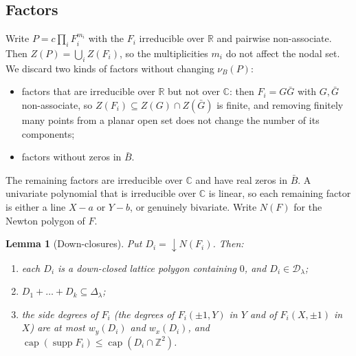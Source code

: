 \documentclass[11pt]{amsart}
\newtheorem{lemma}[theorem]{Lemma}
\theoremstyle{definition}
\theoremstyle{remark}
\newcommand{\R}{\mathbb{R}}
\newcommand{\C}{\mathbb{C}}
\newcommand{\Z}{\mathbb{Z}}
\newcommand{\capn}{\operatorname{cap}}
\newcommand{\supp}{\operatorname{supp}}
\newcommand{\down}{{\downarrow}}
\numberwithin{equation}{section}
\begin{document}
\subsection{Factors}
Write $P=c\prod_iF_i^{m_i}$ with the $F_i$ irreducible over $\R$ and pairwise non-associate.
Then $Z(P)=\bigcup_iZ(F_i)$, so the multiplicities $m_i$ do not affect the nodal set. We
discard two kinds of factors without changing $\nu_B(P)$:
\begin{itemize}[nosep]
\item factors that are irreducible over $\R$ but not over $\C$: then $F_i=G\bar G$ with
$G,\bar G$ non-associate, so $Z(F_i)\subseteq Z(G)\cap Z(\bar G)$ is finite, and removing
finitely many points from a planar open set does not change the number of its components;
\item factors without zeros in $\bar B$.
\end{itemize}
The remaining factors are irreducible over $\C$ and have real zeros in $\bar B$. A
univariate polynomial that is irreducible over $\C$ is linear, so each remaining factor is
either a line $X-a$ or $Y-b$, or genuinely bivariate. Write $N(F)$ for the Newton polygon
of $F$.

\begin{lemma}[Down-closures]\label{lem:down}
Put $D_i=\down N(F_i)$. Then:
\begin{enumerate}[label=(\alph*),nosep]
\item each $D_i$ is a down-closed lattice polygon containing $0$, and $D_i\in\mathcal D_\lambda$;
\item $D_1+\dots+D_k\subseteq\Delta_\lambda$;
\item the side degrees of $F_i$ (the degrees of $F_i(\pm1,Y)$ in $Y$ and of
$F_i(X,\pm1)$ in $X$) are at most $w_y(D_i)$ and $w_x(D_i)$, and
$\capn(\supp F_i)\le\capn(D_i\cap\Z^2)$.
\end{enumerate}
\end{lemma}
\end{document}
